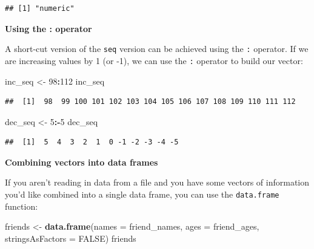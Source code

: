 \documentclass[]{tufte-book}
\newenvironment{Shaded}{\begin{snugshade}}{\end{snugshade}}
\newcommand{\AttributeTok}[1]{\textcolor[rgb]{0.13,0.29,0.53}{#1}}
\newcommand{\ConstantTok}[1]{\textcolor[rgb]{0.56,0.35,0.01}{#1}}
\newcommand{\DecValTok}[1]{\textcolor[rgb]{0.00,0.00,0.81}{#1}}
\newcommand{\FunctionTok}[1]{\textcolor[rgb]{0.13,0.29,0.53}{\textbf{#1}}}
\newcommand{\NormalTok}[1]{#1}
\newcommand{\OtherTok}[1]{\textcolor[rgb]{0.56,0.35,0.01}{#1}}
\newcommand{\SpecialCharTok}[1]{\textcolor[rgb]{0.81,0.36,0.00}{\textbf{#1}}}
\begin{document}
\begin{verbatim}
## [1] "numeric"
\end{verbatim}

\vspace*{0.2in}

\noindent\textbf{Using the : operator}\vspace*{0.1in}

A short-cut version of the \texttt{seq} version can be achieved using the \texttt{:} operator. If we are increasing values by 1 (or -1), we can use the \texttt{:} operator to build our vector:

\begin{Shaded}
\begin{Highlighting}[]
\NormalTok{inc\_seq }\OtherTok{\textless{}{-}} \DecValTok{98}\SpecialCharTok{:}\DecValTok{112}
\NormalTok{inc\_seq}
\end{Highlighting}
\end{Shaded}

\begin{verbatim}
##  [1]  98  99 100 101 102 103 104 105 106 107 108 109 110 111 112
\end{verbatim}

\begin{Shaded}
\begin{Highlighting}[]
\NormalTok{dec\_seq }\OtherTok{\textless{}{-}} \DecValTok{5}\SpecialCharTok{:{-}}\DecValTok{5}
\NormalTok{dec\_seq}
\end{Highlighting}
\end{Shaded}

\begin{verbatim}
##  [1]  5  4  3  2  1  0 -1 -2 -3 -4 -5
\end{verbatim}

\vspace*{0.2in}

\noindent\textbf{Combining vectors into data frames}\vspace*{0.1in}

If you aren't reading in data from a file and you have some vectors of information you'd like combined into a single data frame, you can use the \texttt{data.frame} function:

\begin{Shaded}
\begin{Highlighting}[]
\NormalTok{friends }\OtherTok{\textless{}{-}} \FunctionTok{data.frame}\NormalTok{(}\AttributeTok{names =}\NormalTok{ friend\_names,}
           \AttributeTok{ages =}\NormalTok{ friend\_ages,}
           \AttributeTok{stringsAsFactors =} \ConstantTok{FALSE}\NormalTok{)}
\NormalTok{friends}
\end{Highlighting}
\end{Shaded}
\end{document}
